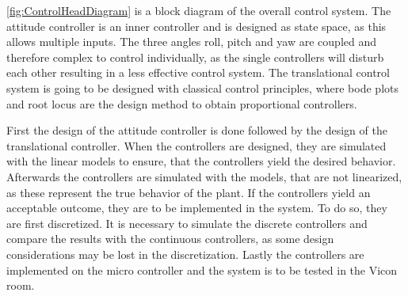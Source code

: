 \autoref{fig:ControlHeadDiagram} is a block diagram of the overall control system.
The attitude controller is an inner controller and is designed as state space, as this allows multiple inputs. The three angles roll, pitch and yaw are coupled and therefore complex to control individually, as the single controllers will disturb each other resulting in a less effective control system. The translational control system is going to be designed with classical control principles, where bode plots and root locus are the design method to obtain proportional controllers. 

First the design of the attitude controller is done followed by the design of the translational controller. 
When the controllers are designed, they are simulated with the linear models to ensure, that the controllers yield the desired behavior. Afterwards the controllers are simulated with the models, that are not linearized, as these represent the true behavior of the plant. If the controllers yield an acceptable outcome, they are to be implemented in the system. To do so, they are first discretized. It is necessary to simulate the discrete controllers and compare the results with the continuous controllers, as some design considerations may be lost in the discretization. Lastly the controllers are implemented on the micro controller and the system is to be tested in the Vicon room. 